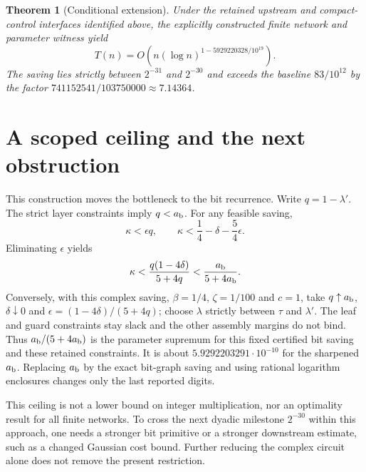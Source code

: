 \documentclass[11pt]{article}
\newtheorem{theorem}{Theorem}
\newcommand{\ab}{a_{\rm b}}
\begin{document}
\begin{theorem}[Conditional extension]
Under the retained upstream and compact-control interfaces identified above,
the explicitly constructed finite network and parameter witness yield
\[
 T(n)=O\!\left(n(\log n)^{1-5929220328/10^{19}}\right).
\]
The saving lies strictly between $2^{-31}$ and $2^{-30}$ and exceeds the
baseline $83/10^{12}$ by the factor
$741152541/103750000\approx7.14364$.
\end{theorem}

\section{A scoped ceiling and the next obstruction}
This construction moves the bottleneck to the bit recurrence.  Write
$q=1-\lambda'$.  The strict layer constraints imply $q<\ab$.
For any feasible saving,
\[
 \kappa<\epsilon q,\qquad
 \kappa<\frac14-\delta-\frac54\epsilon.
\]
Eliminating $\epsilon$ yields
\[
 \kappa<\frac{q(1-4\delta)}{5+4q}
         <\frac{\ab}{5+4\ab}.
\]
Conversely, with this complex saving, $\beta=1/4$, $\zeta=1/100$ and
$c=1$, take $q\uparrow\ab$, $\delta\downarrow0$ and
$\epsilon=(1-4\delta)/(5+4q)$; choose $\lambda$ strictly between
$\tau$ and $\lambda'$.  The leaf and guard constraints stay slack and
the other assembly margins do not bind.  Thus $\ab/(5+4\ab)$ is the
parameter supremum for this fixed certified bit saving and these retained
constraints.  It is about $5.9292203291\cdot10^{-10}$ for the sharpened
$\ab$.  Replacing $\ab$ by the exact bit-graph saving and using rational
logarithm enclosures changes only the last reported digits.

This ceiling is not a lower bound on integer multiplication, nor an
optimality result for all finite networks.  To cross the next dyadic
milestone $2^{-30}$ within this approach, one needs a stronger bit
primitive or a stronger downstream estimate, such as a changed Gaussian
cost bound.  Further reducing the complex circuit alone does not remove
the present restriction.
\end{document}
